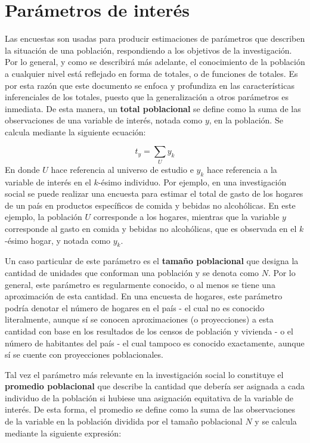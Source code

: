 \documentclass[
  12pt,
  spanish,
]{book}
\begin{document}
\hypertarget{paruxe1metros-de-interuxe9s}{%
\section{Parámetros de interés}\label{paruxe1metros-de-interuxe9s}}

Las encuestas son usadas para producir estimaciones de parámetros que describen la situación de una población, respondiendo a los objetivos de la investigación. Por lo general, y como se describirá más adelante, el conocimiento de la población a cualquier nivel está reflejado en forma de totales, o de funciones de totales. Es por esta razón que este documento se enfoca y profundiza en las características inferenciales de los totales, puesto que la generalización a otros parámetros es inmediata. De esta manera, un \textbf{total poblacional} se define como la suma de las observaciones de una variable de interés, notada como \(y\), en la población. Se calcula mediante la siguiente ecuación:

\[t_y = \sum_U y_k\]
En donde \(U\) hace referencia al universo de estudio e \(y_k\) hace referencia a la variable de interés en el \(k\)-ésimo individuo. Por ejemplo, en una investigación social se puede realizar una encuesta para estimar el total de gasto de los hogares de un país en productos específicos de comida y bebidas no alcohólicas. En este ejemplo, la población \(U\) corresponde a los hogares, mientras que la variable \(y\) corresponde al gasto en comida y bebidas no alcohólicas, que es observada en el \(k\)-ésimo hogar, y notada como \(y_k\).

Un caso particular de este parámetro es el \textbf{tamaño poblacional} que designa la cantidad de unidades que conforman una población y se denota como \(N\). Por lo general, este parámetro es regularmente conocido, o al menos se tiene una aproximación de esta cantidad. En una encuesta de hogares, este parámetro podría denotar el número de hogares en el país - el cual no es conocido literalmente, aunque sí se conocen aproximaciones (o proyecciones) a esta cantidad con base en los resultados de los censos de población y vivienda - o el número de habitantes del país - el cual tampoco es conocido exactamente, aunque sí se cuente con proyecciones poblacionales.

Tal vez el parámetro más relevante en la investigación social lo constituye el \textbf{promedio poblacional} que describe la cantidad que debería ser asignada a cada individuo de la población si hubiese una asignación equitativa de la variable de interés. De esta forma, el promedio se define como la suma de las observaciones de la variable en la población dividida por el tamaño poblacional \(N\) y se calcula mediante la siguiente expresión:
\end{document}

